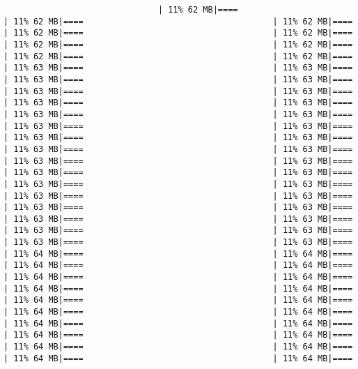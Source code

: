 \documentclass[
]{article}
\begin{document}
\begin{verbatim}
                               | 11% 62 MB|====                                      | 11% 62 MB|====                                      | 11% 62 MB|====                                      | 11% 62 MB|====                                      | 11% 62 MB|====                                      | 11% 62 MB|====                                      | 11% 62 MB|====                                      | 11% 62 MB|====                                      | 11% 62 MB|====                                      | 11% 63 MB|====                                      | 11% 63 MB|====                                      | 11% 63 MB|====                                      | 11% 63 MB|====                                      | 11% 63 MB|====                                      | 11% 63 MB|====                                      | 11% 63 MB|====                                      | 11% 63 MB|====                                      | 11% 63 MB|====                                      | 11% 63 MB|====                                      | 11% 63 MB|====                                      | 11% 63 MB|====                                      | 11% 63 MB|====                                      | 11% 63 MB|====                                      | 11% 63 MB|====                                      | 11% 63 MB|====                                      | 11% 63 MB|====                                      | 11% 63 MB|====                                      | 11% 63 MB|====                                      | 11% 63 MB|====                                      | 11% 63 MB|====                                      | 11% 63 MB|====                                      | 11% 63 MB|====                                      | 11% 63 MB|====                                      | 11% 63 MB|====                                      | 11% 63 MB|====                                      | 11% 63 MB|====                                      | 11% 63 MB|====                                      | 11% 63 MB|====                                      | 11% 63 MB|====                                      | 11% 63 MB|====                                      | 11% 63 MB|====                                      | 11% 64 MB|====                                      | 11% 64 MB|====                                      | 11% 64 MB|====                                      | 11% 64 MB|====                                      | 11% 64 MB|====                                      | 11% 64 MB|====                                      | 11% 64 MB|====                                      | 11% 64 MB|====                                      | 11% 64 MB|====                                      | 11% 64 MB|====                                      | 11% 64 MB|====                                      | 11% 64 MB|====                                      | 11% 64 MB|====                                      | 11% 64 MB|====                                      | 11% 64 MB|====                                      | 11% 64 MB|====                                      | 11% 64 MB|====                                      | 11% 64 MB|====                                      | 11% 64 MB|====                                      | 11% 64 MB|====                                
\end{verbatim}
\end{document}
